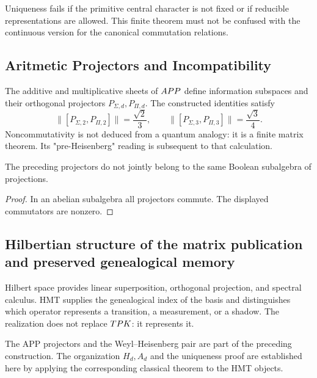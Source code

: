 \begin{controlbox}
Uniqueness fails if the primitive central character is not fixed or if
reducible representations are allowed. This finite theorem must not be confused
with the continuous version for the canonical commutation relations.
\end{controlbox}

\subsection{Aritmetic Projectors and Incompatibility}

The additive and multiplicative sheets of \(APP\) define information
subspaces and their orthogonal projectors
\(P_{\Sigma,d},P_{\Pi,d}\). The constructed identities satisfy
\[
 \|[P_{\Sigma,2},P_{\Pi,2}]\|
 =\frac{\sqrt2}{3},
 \qquad
 \|[P_{\Sigma,3},P_{\Pi,3}]\|
 =\frac{\sqrt3}{4}.
\]
Noncommutativity is not deduced from a quantum analogy: it is a finite
matrix theorem. Its "pre-Heisenberg" reading is subsequent to that calculation.

\begin{proposition}
The preceding projectors do not jointly belong to the same
Boolean subalgebra of projections.
\end{proposition}

\begin{proof}
In an abelian subalgebra all projectors commute. The displayed commutators
are nonzero.
\end{proof}

\subsection{Hilbertian structure of the matrix publication and preserved genealogical memory}

Hilbert space provides linear superposition, orthogonal projection,
and spectral calculus. HMT supplies the genealogical index of the basis and distinguishes
which operator represents a transition, a measurement, or a shadow. The
realization does not replace \(TPK\): it represents it.

\begin{sourcebox}
The APP projectors and the Weyl--Heisenberg pair are part of the preceding
construction. The organization \(H_d,A_d\) and the uniqueness proof are established
here by applying the corresponding classical theorem to the HMT
objects.
\end{sourcebox}


